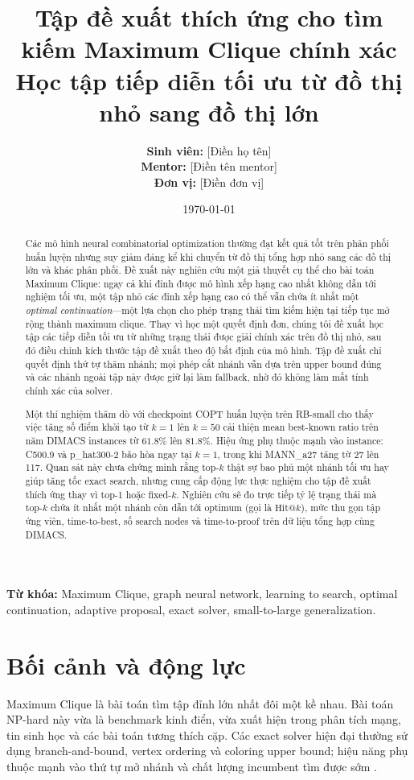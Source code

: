 \documentclass[11pt,a4paper]{article}
\title{%
    Tập đề xuất thích ứng cho tìm kiếm Maximum Clique chính xác\\[0.25em]
    \large Học tập tiếp diễn tối ưu từ đồ thị nhỏ sang đồ thị lớn
}
\author{%
    \textbf{Sinh viên:} [Điền họ tên]\\
    \textbf{Mentor:} [Điền tên mentor]\\
    \textbf{Đơn vị:} [Điền đơn vị]
}
\date{\today}
\makeatletter
\newcommand{\hitk}{\mathrm{Hit@}k}
\makeatother
\begin{document}
\maketitle
\vspace{-1.2em}

\begin{abstract}
Các mô hình neural combinatorial optimization thường đạt kết quả tốt trên phân phối huấn luyện nhưng suy giảm đáng kể khi chuyển từ đồ thị tổng hợp nhỏ sang các đồ thị lớn và khác phân phối. Đề xuất này nghiên cứu một giả thuyết cụ thể cho bài toán Maximum Clique: ngay cả khi đỉnh được mô hình xếp hạng cao nhất không dẫn tới nghiệm tối ưu, một tập nhỏ các đỉnh xếp hạng cao có thể vẫn chứa ít nhất một \emph{optimal continuation}---một lựa chọn cho phép trạng thái tìm kiếm hiện tại tiếp tục mở rộng thành maximum clique. Thay vì học một quyết định đơn, chúng tôi đề xuất học tập các tiếp diễn tối ưu từ những trạng thái được giải chính xác trên đồ thị nhỏ, sau đó điều chỉnh kích thước tập đề xuất theo độ bất định của mô hình. Tập đề xuất chỉ quyết định thứ tự thăm nhánh; mọi phép cắt nhánh vẫn dựa trên upper bound đúng và các nhánh ngoài tập này được giữ lại làm fallback, nhờ đó không làm mất tính chính xác của solver.

Một thí nghiệm thăm dò với checkpoint COPT huấn luyện trên RB-small cho thấy việc tăng số điểm khởi tạo từ $k=1$ lên $k=50$ cải thiện mean best-known ratio trên năm DIMACS instances từ $61.8\%$ lên $81.8\%$. Hiệu ứng phụ thuộc mạnh vào instance: C500.9 và p\_hat300-2 bão hòa ngay tại $k=1$, trong khi MANN\_a27 tăng từ 27 lên 117. Quan sát này chưa chứng minh rằng top-$k$ thật sự bao phủ một nhánh tối ưu hay giúp tăng tốc exact search, nhưng cung cấp động lực thực nghiệm cho tập đề xuất thích ứng thay vì top-1 hoặc fixed-$k$. Nghiên cứu sẽ đo trực tiếp tỷ lệ trạng thái mà top-$k$ chứa ít nhất một nhánh còn dẫn tới optimum (gọi là $\hitk$), mức thu gọn tập ứng viên, time-to-best, số search nodes và time-to-proof trên dữ liệu tổng hợp cùng DIMACS.
\end{abstract}

\noindent\textbf{Từ khóa:} Maximum Clique, graph neural network, learning to search, optimal continuation, adaptive proposal, exact solver, small-to-large generalization.

\section{Bối cảnh và động lực}

Maximum Clique là bài toán tìm tập đỉnh lớn nhất đôi một kề nhau. Bài toán NP-hard này vừa là benchmark kinh điển, vừa xuất hiện trong phân tích mạng, tin sinh học và các bài toán tương thích cặp. Các exact solver hiện đại thường sử dụng branch-and-bound, vertex ordering và coloring upper bound; hiệu năng phụ thuộc mạnh vào thứ tự mở nhánh và chất lượng incumbent tìm được sớm \citep{prosser2012exact}.
\end{document}
